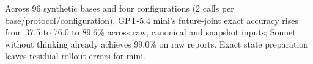 Across 96 synthetic bases and four configurations (2 calls per base/protocol/configuration), GPT-5.4 mini's future-joint exact accuracy rises from 37.5 to 76.0 to 89.6\% across raw, canonical and snapshot inputs; Sonnet without thinking already achieves 99.0\% on raw reports. Exact state preparation leaves residual rollout errors for mini.
